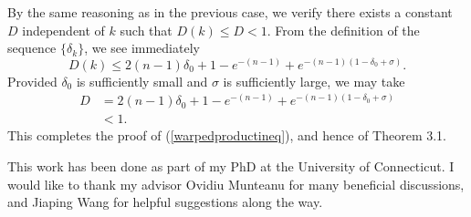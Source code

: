 \documentclass{amsart}
\theoremstyle{definition}
\theoremstyle{remark}
\numberwithin{equation}{section}
\begin{document}
By the same reasoning as in the previous case, we verify there exists a constant $D$ independent of $k$ such that $D(k)\leq D<1$. From the definition of the sequence $\{\delta_k\}$, we see immediately
\begin{equation*}
D(k)\leq 2(n-1)\delta_0+1-e^{-(n-1)}+e^{-(n-1)(1-\delta_0+\sigma)}.
\end{equation*}
Provided $\delta_0$ is sufficiently small and $\sigma$ is sufficiently large, we may take 
\begin{align*}
D&=2(n-1)\delta_0+1-e^{-(n-1)}+e^{-(n-1)(1-\delta_0+\sigma)}\\
&<1.
\end{align*}
This completes the proof of (\ref{warpedproductineq}), and hence of Theorem 3.1.

\quad This work has been done as part of my PhD at the University of Connecticut. I would like to thank my advisor Ovidiu Munteanu for many beneficial discussions, and Jiaping Wang for helpful suggestions along the way.


\end{document}
